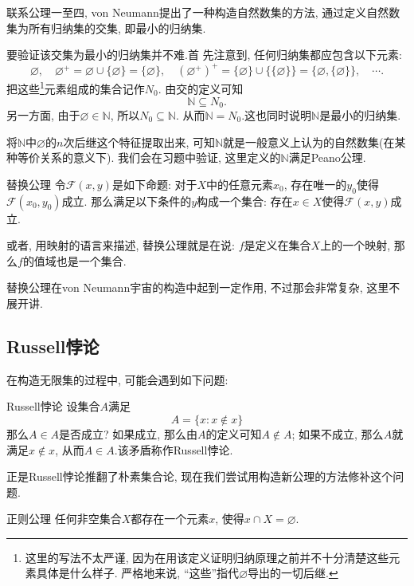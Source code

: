 联系公理一至四, von Neumann提出了一种构造自然数集的方法, 通过定义自然数集为所有归纳集的交集, 即最小的归纳集.

要验证该交集为最小的归纳集并不难.首 先注意到, 任何归纳集都应包含以下元素: $$\varnothing , \quad \varnothing ^{+}=\varnothing \cup \{ \varnothing \}=\{ \varnothing \} , \quad (\varnothing ^{+})^{+} = \{ \varnothing \} \cup \{ \{ \varnothing \} \} = \{ \varnothing ,  \{ \varnothing \}\} , \quad \cdots .$$
把这些\footnote{这里的写法不太严谨, 因为在用该定义证明归纳原理之前并不十分清楚这些元素具体是什么样子. 严格地来说, “这些”指代$\varnothing$导出的一切后继. }元素组成的集合记作$N_0$. 由交的定义可知$$\mathbb{N} \subseteq N_0.$$
另一方面, 由于$\varnothing \in \mathbb{N}$, 所以$N_0 \subseteq \mathbb{N}$. 从而$\mathbb{N} = N_0$.这也同时说明$\mathbb{N}$是最小的归纳集.

将$\mathbb{N}$中$\varnothing$的$n$次后继这个特征提取出来, 可知$\mathbb{N}$就是一般意义上认为的自然数集(在某种等价关系的意义下). 我们会在习题中验证, 这里定义的$\mathbb{N}$满足Peano公理. 

\begin{axiom}{替换公理}
	令$\mathcal{F}(x, y)$是如下命题: 对于$X$中的任意元素$x_0$, 存在唯一的$y_0$使得$\mathcal{F}(x_0, y_0)$成立. 那么满足以下条件的$y$构成一个集合: 存在$x \in X$使得$\mathcal{F}(x, y)$成立.
\end{axiom}

或者, 用映射的语言来描述, 替换公理就是在说: $f$是定义在集合$X$上的一个映射, 那么$f$的值域也是一个集合.

替换公理在von Neumann宇宙的构造中起到一定作用, 不过那会非常复杂, 这里不展开讲.

\subsection{Russell悖论}

在构造无限集的过程中, 可能会遇到如下问题: 

\begin{definition}{Russell悖论}
	设集合$A$满足$$A = \{ x: x \notin x \}$$
	那么$A \in A$是否成立? 如果成立, 那么由$A$的定义可知$A \notin A$; 如果不成立, 那么$A$就满足$x \notin x$, 从而$A \in A$.该矛盾称作Russell悖论.
\end{definition}

正是Russell悖论推翻了朴素集合论, 现在我们尝试用构造新公理的方法修补这个问题.

\begin{axiom}{正则公理}
	任何非空集合$X$都存在一个元素$x$, 使得$x \cap X = \varnothing$.
\end{axiom}

